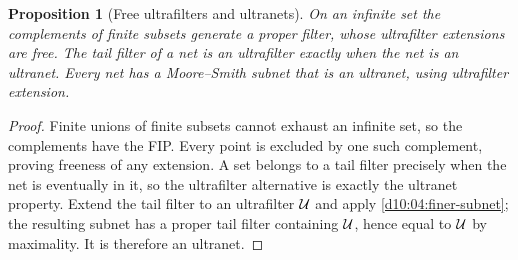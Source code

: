 \documentclass[11pt,oneside,openany]{book}
\newtheorem{proposition}[theorem]{Proposition}
\theoremstyle{definition}
\theoremstyle{remark}
\begin{document}
\begin{proposition}[Free ultrafilters and ultranets]\label{d10:05:ultranet}
On an infinite set the complements of finite subsets generate a proper filter, whose ultrafilter extensions are free. The tail filter of a net is an ultrafilter exactly when the net is an ultranet. Every net has a Moore--Smith subnet that is an ultranet, using ultrafilter extension.
\end{proposition}
\begin{proof}
Finite unions of finite subsets cannot exhaust an infinite set, so the complements have the FIP. Every point is excluded by one such complement, proving freeness of any extension. A set belongs to a tail filter precisely when the net is eventually in it, so the ultrafilter alternative is exactly the ultranet property. Extend the tail filter to an ultrafilter $\mathcal U$ and apply \cref{d10:04:finer-subnet}; the resulting subnet has a proper tail filter containing $\mathcal U$, hence equal to $\mathcal U$ by maximality. It is therefore an ultranet.
\end{proof}
\end{document}

